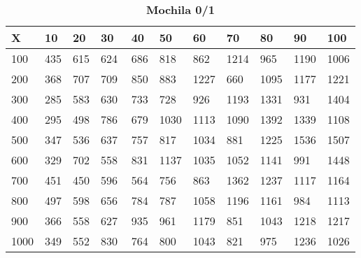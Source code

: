 \documentclass[10pt,letterpaper]{article}
\begin{document}
\newpage 
{}
\begin{center}
\begin{table}\renewcommand{\arraystretch}{2.5}
\caption{\large \textbf{Mochila 0/1}}
\centering
\begin{tabular} { |m{0.5cm}|m{1.3cm}|m{1.3cm}|m{1.3cm}|m{1.3cm}|m{1.3cm}|m{1.3cm}|m{1.3cm}|m{1.3cm}|m{1.3cm}|m{1.3cm}|} 
\hline
\rowcolor{Gray}
\centering \textbf{X} & \centering \textbf{10} & \centering \textbf{20} & \centering \textbf{30}\ & \centering \textbf{40} & \centering \textbf{50} & \centering \textbf{60}\ & \centering \textbf{70} & \centering \textbf{80} & \centering \textbf{90}\ & \textbf{100} \\\hline
\cellcolor{Gray}100 & \Large 435 & \Large 615 & \Large 624 & \Large 686 & \Large 818 & \Large 862 & \Large 1214 & \Large 965 & \Large 1190 & \Large 1006 \\
\hline
\cellcolor{Gray}200 & \Large 368 & \Large 707 & \Large 709 & \Large 850 & \Large 883 & \Large 1227 & \Large 660 & \Large 1095 & \Large 1177 & \Large 1221 \\
\hline
\cellcolor{Gray}300 & \Large 285 & \Large 583 & \Large 630 & \Large 733 & \Large 728 & \Large 926 & \Large 1193 & \Large 1331 & \Large 931 & \Large 1404 \\
\hline
\cellcolor{Gray}400 & \Large 295 & \Large 498 & \Large 786 & \Large 679 & \Large 1030 & \Large 1113 & \Large 1090 & \Large 1392 & \Large 1339 & \Large 1108 \\
\hline
\cellcolor{Gray}500 & \Large 347 & \Large 536 & \Large 637 & \Large 757 & \Large 817 & \Large 1034 & \Large 881 & \Large 1225 & \Large 1536 & \Large 1507 \\
\hline
\cellcolor{Gray}600 & \Large 329 & \Large 702 & \Large 558 & \Large 831 & \Large 1137 & \Large 1035 & \Large 1052 & \Large 1141 & \Large 991 & \Large 1448 \\
\hline
\cellcolor{Gray}700 & \Large 451 & \Large 450 & \Large 596 & \Large 564 & \Large 756 & \Large 863 & \Large 1362 & \Large 1237 & \Large 1117 & \Large 1164 \\
\hline
\cellcolor{Gray}800 & \Large 497 & \Large 598 & \Large 656 & \Large 784 & \Large 787 & \Large 1058 & \Large 1196 & \Large 1161 & \Large 984 & \Large 1113 \\
\hline
\cellcolor{Gray}900 & \Large 366 & \Large 558 & \Large 627 & \Large 935 & \Large 961 & \Large 1179 & \Large 851 & \Large 1043 & \Large 1218 & \Large 1217 \\
\hline
\cellcolor{Gray}1000 & \Large 349 & \Large 552 & \Large 830 & \Large 764 & \Large 800 & \Large 1043 & \Large 821 & \Large 975 & \Large 1236 & \Large 1026 \\
\hline
\end{tabular} \\
\end{table}
\end{center}
\end{document}
